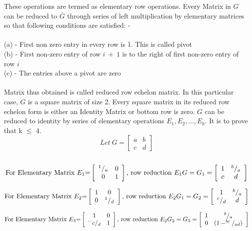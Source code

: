 \documentclass[12pt]{article}
\newcommand\tab[1][1cm]{\hspace*{#1}}
\begin{document}
These operations are termed as elementary row operations. Every Matrix in $G$ can be reduced to $\bar{G}$ through series of left multiplication by elementary matrices so that following conditions are satisfied: -\\ \\
\noindent
\tab (a) - First non zero entry in every row is 1. This is called pivot\\
\noindent
\tab (b) - First non-zero entry of row $i\ +\ 1$ is to the right of first non-zero entry of row $i$\\
\noindent
\tab (c) - The entries above a pivot are zero \\
\\
\noindent
\tab Matrix thus obtained is called reduced row echelon matrix. In this particular case, $G$ is a square matrix of size 2. Every square matrix in its reduced row echelon form is either an Identity Matrix or bottom row is zero. $G$ can be reduced to identity by series of elementary operations $E_1, E_2,...,E_k$. It is to prove that k $\leq$ 4. \\
\noindent
\tab  
\[Let\ G = \begin{bmatrix}
  a & b \\
  c & d
 \end{bmatrix}\]
\\
\[ \textnormal{For Elementary Matrix $E_1$=} \left[ \begin{array}{cc}
  ^1/_a & 0 \\
  0 & 1
\end{array} \right]
\textnormal{, row reduction } E_1G = G_1 =
\left[ \begin{array}{cc}
1  & ^b/_a \\
  c & d
\end{array} \right]
\]

\[ \textnormal{For Elementary Matrix $E_2$=} \left[ \begin{array}{cc}
  1 & 0 \\
  0 & ^1/_d
\end{array} \right]
\textnormal{, row reduction } E_2G_1 = G_2 =
\left[ \begin{array}{cc}
1  & ^b/_a \\
  ^c/_d & d
\end{array} \right]
\]

\[ \textnormal{For Elementary Matrix $E_3$=} \left[ \begin{array}{cc}
  1 & 0 \\
  ^-c/_d & 1
\end{array} \right]
\textnormal{, row reduction } E_2G_2 = G_3 =
\left[ \begin{array}{cc}
1  & ^b/_a \\
  0 & (1-^{bc}/_{ad})
\end{array} \right]
\]
\end{document}
